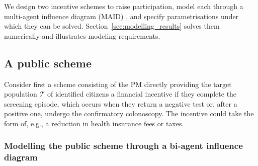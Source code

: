\documentclass[12pt]{article}
\begin{document}
We design two incentive schemes to raise participation, model each through a multi-agent influence diagram (MAID) \citep{banks2015adversarial}, and specify parametrisations under which they can be solved. Section~\ref{sec:modelling_results} solves them numerically and illustrates modeling requirements.

\subsection{A public scheme}\label{sec:public_scheme}
Consider first a scheme consisting of the PM directly providing the target population $\mathcal{T}$ of identified citizens a financial incentive if they complete the screening episode, which occurs when they return a negative test or, after a positive one, undergo the confirmatory colonoscopy. The incentive could take the form of, e.g., a reduction in health insurance fees or taxes.

\subsubsection{Modelling the public scheme through a bi-agent influence diagram}
\end{document}
